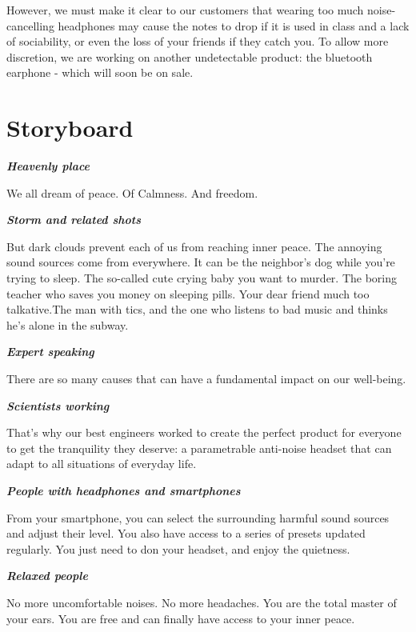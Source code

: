 \documentclass[12pt, a4paper]{article}
\begin{document}
    However, we must make it clear to our customers that wearing too much noise-cancelling headphones may cause the notes to drop if it is used in class and a lack of sociability, or even the loss of your friends if they catch you. To allow more discretion, we are working on another undetectable product: the bluetooth earphone - which will soon be on sale.


    \section{Storyboard}

    \begin{flushleft}
    \selectfont

    \emph{\textbf{Heavenly place}}\medskip

    We all dream of peace. Of Calmness. And freedom.\medskip

    \emph{\textbf{Storm and related shots}}\medskip

    But dark clouds prevent each of us from reaching inner peace. The annoying sound sources come from everywhere. It can be the neighbor's dog while you're trying to sleep. The so-called cute crying baby you want to murder. The boring teacher who saves you money on sleeping pills. Your dear friend much too talkative.The man with tics, and the one who listens to bad music and thinks he's alone in the subway.\medskip

    \emph{\textbf{Expert speaking}}\medskip

    There are so many causes that can have a fundamental impact on our well-being.\medskip

    \emph{\textbf{Scientists working}}\medskip

    That's why our best engineers worked to create the perfect product for everyone to get the tranquility they deserve: a parametrable anti-noise headset that can adapt to all situations of everyday life.\medskip

    \emph{\textbf{People with headphones and smartphones}}\medskip

    From your smartphone, you can select the surrounding harmful sound sources and adjust their level. You also have access to a series of presets updated regularly. You just need to don your headset, and enjoy the quietness.\medskip

    \emph{\textbf{Relaxed people}}\medskip

    No more uncomfortable noises. No more headaches. You are the total master of your ears. You are free and can finally have access to your inner peace.\medskip
    \end{flushleft}  
\end{document}
